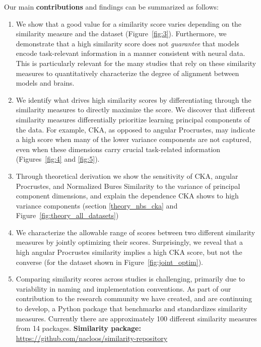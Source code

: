 \documentclass{article} %
\begin{document}
Our main \textbf{contributions} and findings can be summarized as follows:
\begin{enumerate}
\item We show that a good value for a similarity score varies depending on the similarity measure and the dataset (Figure~\ref{fig:3}). Furthermore, we demonstrate that a high similarity score does not \textit{guarantee} that models encode task-relevant information in a manner consistent with neural data. This is particularly relevant for the many studies that rely on these similarity measures to quantitatively characterize the degree of alignment between models and brains.

\item We identify what drives high similarity scores by differentiating through the similarity measures to directly maximize the score. We discover that different similarity measures differentially prioritize learning principal components of the data. For example, CKA, as opposed to angular Procrustes, may indicate a high score when many of the lower variance components are not captured, even when these dimensions carry crucial task-related information (Figures~\ref{fig:4} and \ref{fig:5}).%

\item Through theoretical derivation we show the sensitivity of CKA, angular Procrustes, and Normalized Bures Similarity to the variance of principal component dimensions, and explain the dependence CKA shows to high variance components (section \ref{theory_nbs_cka} and Figure~\ref{fig:theory_all_datasets})

\item We characterize the allowable range of scores between two different similarity measures by jointly optimizing their scores. Surprisingly, we reveal that a high angular Procrustes similarity implies a high CKA score, but not the converse (for the dataset shown in Figure~\ref{fig:joint_optim}).

\item Comparing similarity scores across studies is challenging, primarily due to variability in naming and implementation conventions. As part of our contribution to the research community we have created, and are continuing to develop, a Python package that benchmarks and standardizes similarity measures. Currently there are approximately 100 different similarity measures from 14 packages.
\textbf{Similarity package:} 
\href{https://github.com/nacloos/similarity-repository}{https://github.com/nacloos/similarity-repository}



\end{enumerate}
\end{document}
